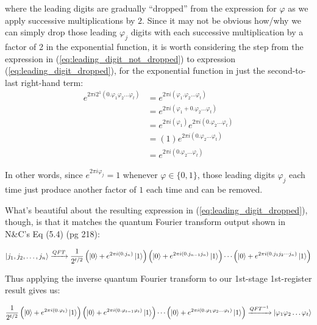 \documentclass{article}
\begin{document}
\begin{enumerate}[label=\textbf{(\arabic*)}]
where the leading digits are gradually ``dropped'' from the expression for $\varphi$ as we apply successive multiplications by $2$. Since it may not be obvious how/why we can simply drop those leading $\varphi_j$ digits with each successive multiplication by a factor of 2 in the exponential function, it is worth considering the step from the expression in (\ref{eq:leading_digit_not_dropped}) to expression (\ref{eq:leading_digit_dropped}), for the exponential function in just the second-to-last right-hand term:
\begin{align}
    e^{2\pi i 2^1 (0.\varphi_{1}\varphi_2\ldots\varphi_{t})}
    &=
    e^{2\pi i (\varphi_{1}.\varphi_2\ldots\varphi_{t})}\\
    &=
    e^{2\pi i (\varphi_{1} + 0.\varphi_2\ldots\varphi_{t})}\\
    &=
    e^{2\pi i (\varphi_{1})}
    e^{2\pi i ( 0.\varphi_2\ldots\varphi_{t})}\\
    &=
    (1)
    e^{2\pi i ( 0.\varphi_2\ldots\varphi_{t})}\\
    &=
    e^{2\pi i ( 0.\varphi_2\ldots\varphi_{t})}
\end{align}

In other words, since $e^{2\pi i \varphi_j} = 1$ whenever $\varphi\in \{0, 1\}$, those leading digits $\varphi_j$ each time just produce another factor of $1$ each time and can be removed.

\vspace{0.1in}

What's beautiful about the resulting expression in (\ref{eq:leading_digit_dropped}), though, is that it matches the quantum Fourier transform output shown in N\&C's Eq (5.4) (pg 218):

\begin{align}
    \ket{j_1, j_2, \ldots, j_n}
    \xrightarrow{QFT}
    \frac{1}{2^{t/2}}\left(\ket{0}+e^{2\pi i (0.j_n)}\ket{1}\right)
      \left(\ket{0}+e^{2\pi i (0.j_{n-1}j_{n})}\ket{1}\right)
      \cdots
      \left(\ket{0}+e^{2\pi i (0.j_1 j_2\cdots j_{n})}\ket{1}\right)
\end{align}

Thus applying the inverse quantum Fourier transform to our 1st-stage 1st-register result gives us:

\begin{align}
    \frac{1}{2^{t/2}}\left(\ket{0}+e^{2\pi i (0.\varphi_{t})}\ket{1}\right)
      \left(\ket{0}+e^{2\pi i (0.\varphi_{t-1}\varphi_{t})}\ket{1}\right)
      \cdots
      \left(\ket{0}+e^{2\pi i (0.\varphi_1\varphi_2\ldots\varphi_{t})}\ket{1}\right)
    \xrightarrow{QFT^{-1}}
    \ket{\varphi_1\varphi_2\ldots\varphi_{t}}
\end{align}


\end{enumerate}
\end{document}
